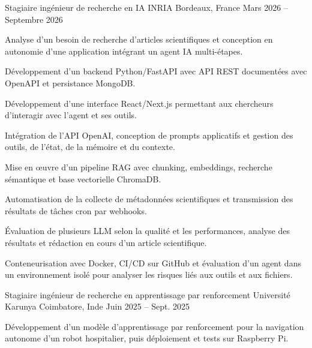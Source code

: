 
\begin{cventries}
  \cventry
    {Stagiaire ingénieur de recherche en IA}
    {INRIA}
    {Bordeaux, France}
    {Mars 2026 -- Septembre 2026}
    {
      \begin{cvitems}
        \item {Analyse d’un besoin de recherche d’articles scientifiques et conception en autonomie d’une application intégrant un agent IA multi-étapes.}
        \item {Développement d’un backend Python/FastAPI avec API REST documentées avec OpenAPI et persistance MongoDB.}
        \item {Développement d’une interface React/Next.js permettant aux chercheurs d’interagir avec l’agent et ses outils.}
        \item {Intégration de l’API OpenAI, conception de prompts applicatifs et gestion des outils, de l’état, de la mémoire et du contexte.}
        \item {Mise en œuvre d’un pipeline RAG avec chunking, embeddings, recherche sémantique et base vectorielle ChromaDB.}
        \item {Automatisation de la collecte de métadonnées scientifiques et transmission des résultats de tâches cron par webhooks.}
        \item {Évaluation de plusieurs LLM selon la qualité et les performances, analyse des résultats et rédaction en cours d’un article scientifique.}
        \item {Conteneurisation avec Docker, CI/CD sur GitHub et évaluation d’un agent dans un environnement isolé pour analyser les risques liés aux outils et aux fichiers.}
      \end{cvitems}
    }

  \cventry
    {Stagiaire ingénieur de recherche en apprentissage par renforcement}
    {Université Karunya}
    {Coimbatore, Inde}
    {Juin 2025 -- Sept. 2025}
    {
      \begin{cvitems}
        \item {Développement d’un modèle d’apprentissage par renforcement pour la navigation autonome d’un robot hospitalier, puis déploiement et tests sur Raspberry Pi.}
      \end{cvitems}
    }
\end{cventries}

